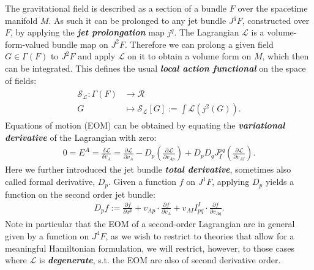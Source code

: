 \documentclass[%
 reprint,
nofootinbib,
 amsmath,amssymb,
 aps,
 prd,
floatfix,
]{revtex4-2}
\begin{document}
The gravitational field is described as a section of a bundle $F$ over the spacetime manifold $M$. As such it can be prolonged to any jet bundle $J^qF$, constructed over $F$, by applying the \textit{\textbf{jet prolongation}} map $j^q$. 
The Lagrangian $\mathcal{L}$ is a volume-form-valued bundle map on $J^2F$. Therefore we can prolong a given field $G \in \Gamma(F)$ to $J^2F$ and apply $\mathcal{L}$ on it to obtain a volume form on $M$, which then can be integrated.
This defines the usual \textit{\textbf{local action functional}} on the space of fields:
\begin{align}
\begin{aligned}
    \mathcal{S}_{\mathcal{L}} : \Gamma(F) &\longrightarrow \mathcal{R} \\
    G &\longmapsto \mathcal{S}_{\mathcal{L}}[G] := \int \mathcal{L}(j^2(G)).
\end{aligned}
\end{align}
Equations of motion (EOM) can be obtained by equating the \textit{\textbf{variational derivative}} of the Lagrangian with zero:
\begin{align}
  0 = E^A = \frac{\delta \mathcal{L}}{\delta v_A} = 
  \frac{\partial\mathcal{L}}{\partial v_A} - D_p ( \frac{\partial \mathcal{L}}{\partial v_{Ap}}) 
  + D_p D_q J^{pq}_I (\frac{\partial \mathcal{L}}{\partial v_{AI}}).
\end{align}
Here we further introduced the jet bundle \textit{\textbf{total derivative}}, sometimes also called formal derivative, $D_p$.
Given a function $f$ on $J^1F$, applying $D_p$ yields a function on the second order jet bundle:
\begin{align}
    D_p f := \frac{\partial f}{\partial x^p} + v_{Ap} \cdot  \frac{\partial f}{\partial v_A} + v_{AI} I^{I}_{pq} \cdot \frac{\partial f}{ \partial v_{Aq}}.
\end{align}
Note in particular that the EOM of a second-order Lagrangian are in general given by a function on $J^4F$, as we wish to restrict to theories that allow for a meaningful Hamiltonian formulation, we will restrict, however, to those cases where $\mathcal{L}$ is \textit{\textbf{degenerate}}, s.t. the EOM are also of second derivative order. 
\end{document}
